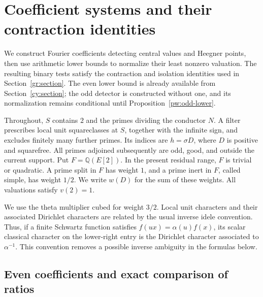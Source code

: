 \section{Coefficient systems and their contraction identities}
\label{co:section}

We construct Fourier coefficients detecting central values and Heegner
points, then use arithmetic lower bounds to normalize their least nonzero
valuation.  The resulting binary tests satisfy the contraction and isolation
identities used in Section~\ref{gr:section}.  The even lower bound is already
available from Section~\ref{cy:section}; the odd detector is constructed
without one, and its normalization remains conditional until
Proposition~\ref{pw:odd-lower}.

Throughout, $S$ contains $2$ and the primes dividing the
conductor $N$.  A filter prescribes local unit squareclasses at $S$, together
with the infinite sign, and excludes finitely many further primes.  Its
indices are $h=\sigma D$, where $D$ is positive and squarefree.  All primes
adjoined subsequently are odd, good, and outside the current support.
Put $F=\mathbb Q(E[2])$.  In the present residual range, $F$ is trivial or
quadratic.  A prime split in $F$ has weight $1$, and a prime inert in $F$,
called simple, has weight $1/2$.  We write $w(D)$ for the sum of these weights.
All valuations satisfy $v(2)=1$.

We use the theta multiplier cubed for weight $3/2$.  Local unit characters
and their associated Dirichlet characters are related by the usual inverse
idele convention.  Thus, if a finite Schwartz function satisfies
$f(ux)=\alpha(u)f(x)$, its scalar classical character on the lower-right
entry is the Dirichlet character associated to $\alpha^{-1}$.
This convention removes a possible inverse ambiguity in the formulas below.

\subsection{Even coefficients and exact comparison of ratios}

